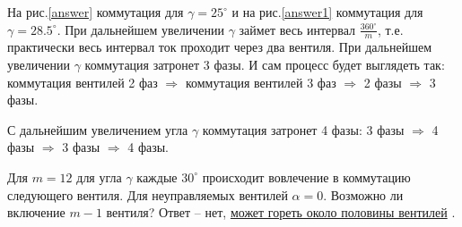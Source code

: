 \documentclass{article}
\begin{document}
На рис.\ref{answer} коммутация для $\gamma=25^\circ$ и на рис.\ref{answer1} коммутация для $\gamma=28.5^\circ$.
 При дальнейшем увеличении $\gamma$ займет весь интервал ${\displaystyle \frac{360^\circ}{m}}$, т.е. практически весь интервал ток проходит через два вентиля.
 При дальнейшем увеличении $\gamma$ коммутация затронет 3 фазы. И сам процесс будет выглядеть так: коммутация вентилей 2 фаз $\Rightarrow$ коммутация вентилей 3 фаз $\Rightarrow$ 2 фазы $\Rightarrow$ 3 фазы.

 С дальнейшим увеличением угла $\gamma$ коммутация затронет 4 фазы: 3 фазы $\Rightarrow$ 4 фазы $\Rightarrow$ 3 фазы $\Rightarrow$ 4 фазы.

 Для $m=12$ для угла $\gamma$ каждые $30^\circ$ происходит вовлечение в коммутацию следующего вентиля. Для неуправляемых вентилей $\alpha=0$. Возможно ли включение $m-1$ вентиля? Ответ -- нет,
 \href{http://e-heritage.ru/ras/view/publication/general.html?id=48315927}{может гореть около половины вентилей} \cite{KNB}. 
 
\end{document}
